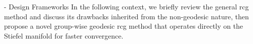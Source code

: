 \documentclass[journal]{IEEEtran}
\begin{document}
\begin{section}{- Design Frameworks}
	In the following context, we briefly review the general \gls{rcg} method and discuss its drawbacks inherited from the non-geodesic nature, then propose a novel group-wise geodesic \gls{rcg} method that operates directly on the Stiefel manifold for faster convergence.


\end{section}
\end{document}
